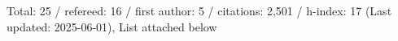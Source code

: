 Total: 25 / refereed: 16 / first author: 5 / citations: 2,501 / h-index: 17 (Last updated: 2025-06-01), List attached below